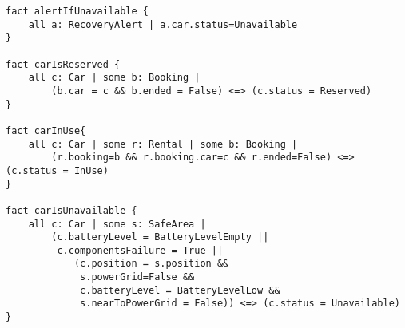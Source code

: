 \begin{lstlisting}
fact alertIfUnavailable {
	all a: RecoveryAlert | a.car.status=Unavailable
}

fact carIsReserved {
	all c: Car | some b: Booking |
		(b.car = c && b.ended = False) <=> (c.status = Reserved)
}

fact carInUse{
	all c: Car | some r: Rental | some b: Booking |
		(r.booking=b && r.booking.car=c && r.ended=False) <=> (c.status = InUse)
}

fact carIsUnavailable {
	all c: Car | some s: SafeArea |
		(c.batteryLevel = BatteryLevelEmpty ||
		 c.componentsFailure = True || 
			(c.position = s.position &&
			 s.powerGrid=False &&
			 c.batteryLevel = BatteryLevelLow &&
			 s.nearToPowerGrid = False)) <=> (c.status = Unavailable)
}
\end{lstlisting}
